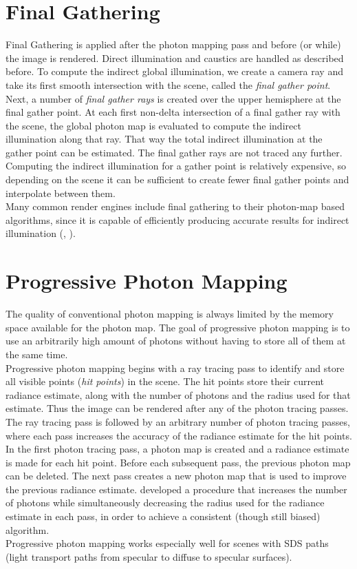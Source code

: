 \section{Final Gathering}
\label{final gathering}

Final Gathering is applied after the photon mapping pass and before (or while) the image is rendered. Direct illumination and caustics are handled as described before. To compute the indirect global illumination, we create a camera ray and take its first smooth intersection with the scene, called the \emph{final gather point}. Next, a number of \emph{final gather rays} is created over the upper hemisphere at the final gather point. At each first non-delta intersection of a final gather ray with the scene, the global photon map is evaluated to compute the indirect illumination along that ray. That way the total indirect illumination at the gather point can be estimated. The final gather rays are not traced any further.\\
Computing the indirect illumination for a gather point is relatively expensive, so depending on the scene it can be sufficient to create fewer final gather points and interpolate between them.\\
Many common render engines include final gathering to their photon-map based algorithms, since it is capable of efficiently producing accurate results for indirect illumination  (\cite{mentalray}, \cite{finalg}).

\section{Progressive Photon Mapping}
\label{prophoma}
The quality of conventional photon mapping is always limited by the memory space available for the photon map. The goal of progressive photon mapping is to use an arbitrarily high amount of photons without having to store all of them at the same time. \cite{ppm}\\
Progressive photon mapping begins with a ray tracing pass to identify and store all visible points (\emph{hit points}) in the scene. The hit points store their current radiance estimate, along with the number of photons and the radius used for that estimate. Thus the image can be rendered after any of the photon tracing passes.\\
The ray tracing pass is followed by an arbitrary number of photon tracing passes, where each pass increases the accuracy of the radiance estimate for the hit points. In the first photon tracing pass, a photon map is created and a radiance estimate is made for each hit point.  
Before each subsequent pass, the previous photon map can be deleted. The next pass creates a new photon map that is used to improve the previous radiance estimate. \cite{ppm} developed a procedure that increases the number of photons while simultaneously decreasing the radius used for the radiance estimate in each pass, in order to achieve a consistent (though still biased) algorithm.\\
Progressive photon mapping works especially well for scenes with SDS paths (light transport paths from specular to diffuse to specular surfaces).

